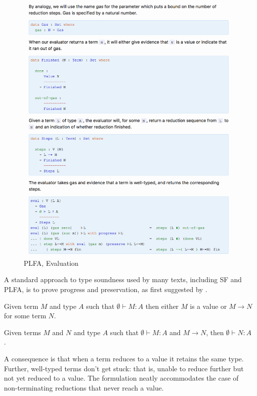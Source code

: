 \documentclass[runningheads]{llncs}
\begin{document}
\begin{figure}
  \includegraphics[width=\textwidth]{figures/plfa-eval.png}
  \caption{PLFA, Evaluation}
  \label{fig:plfa-eval}
\end{figure}  

A standard approach to type soundness used by many texts,
including SF and PLFA, is to prove progress and preservation,
as first suggested by \citet{Wright-and-Felleisen-1994}.

\begin{theorem}[Progress] Given term $M$ and type $A$ such that
$\emptyset \vdash M : A$ then either $M$ is a value or
$M \longrightarrow N$ for some term $N$.
\end{theorem}

\begin{theorem}[Preservation] Given terms $M$ and $N$ and type $A$
such that $\emptyset \vdash M : A$ and $M \longrightarrow N$, then
$\emptyset \vdash N : A$.  \end{theorem}

A consequence is that when a term reduces to a value it retains
the same type.  Further, well-typed terms don't get stuck:
that is, unable to reduce further but not yet reduced to a value.
The formulation neatly accommodates the case of non-terminating
reductions that never reach a value.
\end{document}
